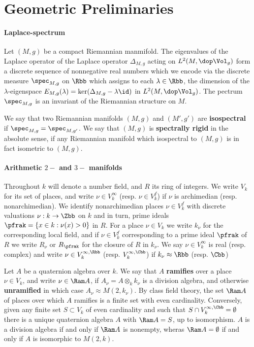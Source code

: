\section{Geometric Preliminaries}
\paragraph{Laplace-spectrum}
Let $(M,g)$ be a compact Riemannian manmifold. The eigenvalues of the Laplace operator of the Laplace operator $\Delta_{M,g}$ acting on $L^2(M,\dop \Vol_g)$ form a discrete sequence of nonnegative real numbers which we encode via the discrete measure $\spec_{M,g}$ on $\Rbb$ which assigns to each $\lambda \in \Rbb$, the dimension of the $\lambda$-eigenspace $E_{M,g}(\lambda)=\ker (\Delta_{M,g}- \lambda \id)$ in $L^2(M, \dop \Vol_g)$. The pectrum $\spec_{M,g}$ is an invariant of the Riemannian structure on $M$.

We say that two Riemannian manifolds $(M,g)$ and $(M',g')$ are \textbf{isospectral} if $\spec_{M,g} = \spec_{M,g'}$. We say that $(M,g)$ is \textbf{spectrally rigid} in the absolute sense, if any Riemannian manifold which isospectral to $(M,g)$ is in fact isometric to $(M,g)$.

\paragraph{Arithmetic $2-$ and $3-$ manifolds}
Throughout $k$ will denote a number field, and $R$ its ring of integers. We write $V_k$ for its set of places, and write $\nu \in V_k^\infty$ (resp. $\nu \in V_k^f$) if $\nu$ is archimedian (resp. nonarchimedian).
We identify nonarchimedian places $\nu \in V_k^f$ with discrete valuations $\nu : k \to \Zbb$ on $k$ and in turn, prime ideals $\pfrak = \{ x \in k: \nu(x) > 0\}$ in $R$.
For a place $\nu \in V_k$ we write $k_\nu$ for the corresponding local field, and if $\nu \in V_k^f$ corresponding to a prime ideal $\pfrak$ of $R$ we write $R_\nu$ or $R_\pfrak$ for the closure of $R$ in $k_\nu$.
We say $\nu \in V_k^\infty$ is real (resp. complex) and write $\nu \in V_k^{\infty,\Rbb}$ (resp. $V_k^{\infty,\Cbb}$) if $k_\nu \approx \Rbb$ (resp. $\Cbb$)

Let $A$ be a quaternion algebra over $k$. We say that $A$ \textbf{ramifies} over a place $\nu \in V_k$, and write $\nu \in \Ram A$, if $A_\nu = A \otimes_k k_\nu$ is a division algebra, and otherwise \textbf{unramified} in which case $A_\nu \approx M(2,k_\nu)$.
By class field theory, the set $\Ram A$ of places over which $A$ ramifies is a finite set with even cardinality. Conversely, given any finite set $S \subset V_k$ of even cardinality and such that $S\cap V_k^{\infty,\Cbb}=\emptyset$ there is a unique quaternion algebra $A$ with $\Ram A = S$, up to isomorphism. $A$ is a division algebra if and only if $\Ram A$ is nonempty, wheras $\Ram A = \emptyset$ if and only if $A$ is isomorphic to $M(2,k)$.

